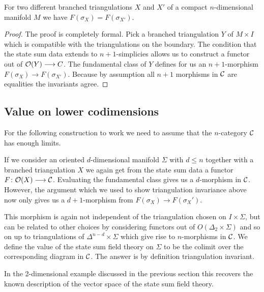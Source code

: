 \begin{theorem}
	For two different branched triangulations $X$ and $X'$ of a compact $n$-dimensional manifold $M$ we have $F(\sigma_X)=F(\sigma_{X'})$.
\end{theorem}

\begin{proof}
	The proof is completely formal.
	Pick a branched triangulation $Y$ of $M\times I$ which is compatible with the triangulations on the boundary.
	The condition that the state sum data extends to $n+1$-simplicies allows us to construct a functor out of $\mathcal{O}(Y)\longrightarrow C $.
	The fundamental class of $Y$ defines for us an $n+1$-morphism $F(\sigma_X)\longrightarrow F(\sigma_{X'})$.
	Because by assumption all $n+1$ morphisms in $\mathcal{C}$ are equalities the invariants agree.
\end{proof}

\begin{remark}
\end{remark}

\subsection{Value on lower codimensions}

For the following construction to work we need to assume that the $n$-category $\mathcal{C}$ has enough limits.

If we consider an oriented $d$-dimensional manifold $\Sigma$ with $d\leq n$ together with a  branched triangulation $X$ we again get from the state sum data a functor $F\colon \mathcal{O}(X)\longrightarrow \mathcal{C}$.
Evaluating the fundamental class gives us a $d$-morphism in
$\mathcal{C}$.
However, the argument which we used to show triangulation invariance above now only gives us a $d+1$-morphism from $F(\sigma_X) \longrightarrow F(\sigma_X')$.

This morphism is again not independent of the triangulation chosen on $I\times \Sigma $, but can be related to other choices by considering functors out of $O(\Delta_2 \times \Sigma)$ and so on up to triangulations of $\Delta^{n-d}\times \Sigma $ which give rise to $n$-morphisms in $\mathcal{C}$.
We define the value of the state sum field theory on $\Sigma$ to be the colimit over the corresponding diagram in $\mathcal{C}$.
The answer is by definition triangulation invariant.


In the 2-dimensional example discussed in the previous section this recovers the known description of the vector space of the state sum field theory.

